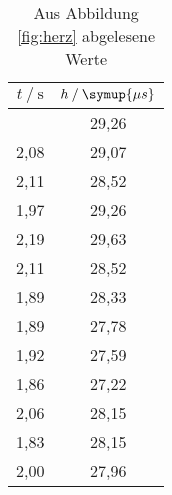 \begin{table}[H]
   \centering
   \caption{Aus Abbildung \ref{fig:herz} abgelesene Werte}
   \label{tab:herz}
   \begin{tabular} { S S }
 \toprule
 {$t\:/\: \mathrm{s}$} & {$h\:/\: \symup{\mu s}$} \\
    \midrule
     & 29,26 \\
    2,08 & 29,07 \\
    2,11 & 28,52 \\
    1,97 & 29,26 \\
    2,19 & 29,63 \\
    2,11 & 28,52 \\
    1,89 & 28,33 \\
    1,89 & 27,78 \\
    1,92 & 27,59 \\
    1,86 & 27,22 \\
    2,06 & 28,15 \\
    1,83 & 28,15 \\
    2,00 & 27,96 \\
    \bottomrule
  \end{tabular}
\end{table}
